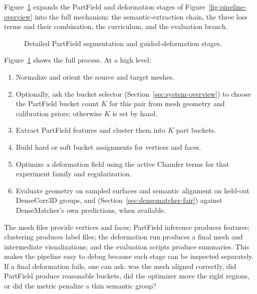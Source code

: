 \documentclass{article}
\begin{document}
Figure~\ref{fig:pipeline} expands the PartField and deformation stages of
Figure~\ref{fig:pipeline-overview} into the full mechanism: the semantic-extraction chain, the
three loss terms and their combination, the curriculum, and the evaluation branch.

\begin{figure}[H]
\centering
\resizebox{0.88\textwidth}{!}{}
\caption{Detailed PartField segmentation and guided-deformation stages.}
\label{fig:pipeline}
\end{figure}

Figure~\ref{fig:pipeline} shows the full process. At a high level:

\begin{enumerate}
  \item Normalize and orient the source and target meshes.
  \item Optionally, ask the bucket selector (Section~\ref{sec:system-overview}) to choose the
  PartField bucket count $K$ for this pair from mesh geometry and calibration
  priors; otherwise $K$ is set by hand.
  \item Extract PartField features and cluster them into $K$ part buckets.
  \item Build hard or soft bucket assignments for vertices and faces.
  \item Optimize a deformation field using the active Chamfer terms for that experiment family and
  regularization.
  \item Evaluate geometry on sampled surfaces and semantic alignment on held-out DenseCorr3D
  groups, and (Section~\ref{sec:densematcher-fair}) against DenseMatcher's own predictions, when
  available.
\end{enumerate}

The mesh
files provide vertices and faces; PartField inference produces features; clustering produces label
files; the deformation run produces a final mesh and intermediate visualizations; and the
evaluation scripts produce summaries. This makes the pipeline easy to debug because
each stage can be inspected separately. If a final deformation fails, one can ask: was the mesh
aligned correctly, did PartField produce reasonable buckets, did the optimizer move the right
regions, or did the metric penalize a thin semantic group?
\end{document}
